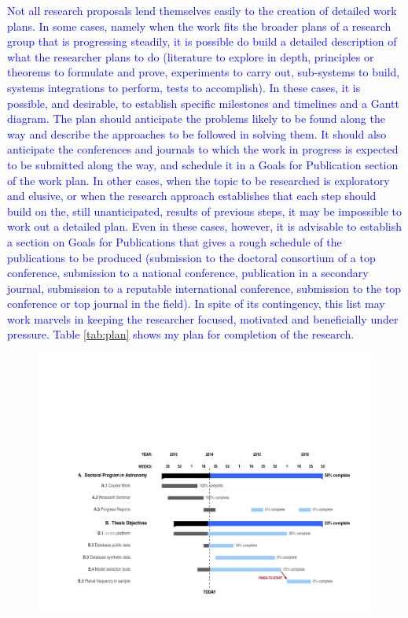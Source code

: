 \textcolor{blue}{
Not all research proposals lend themselves easily to the creation of detailed work plans. 
In some cases, namely when the work fits the broader plans of a research group that is 
progressing steadily, it is possible do build a detailed description of what the researcher 
plans to do (literature to explore in depth, principles or theorems to formulate and 
prove, experiments to carry out, sub-systems to build, systems integrations to perform, 
tests to accomplish). In these cases, it is possible, and desirable, to establish specific 
milestones and timelines and a Gantt diagram. The plan should anticipate the problems 
likely to be found along the way and describe the approaches to be followed in solving 
them. It should also anticipate the conferences and journals to which the work in 
progress is expected to be submitted along the way, and schedule it in a Goals for 
Publication section of the work plan. 
In other cases, when the topic to be researched is exploratory and elusive, or when the 
research approach establishes that each step should build on the, still unanticipated, 
results of previous steps, it may be impossible to work out a detailed plan. Even in these 
cases, however, it is advisable to establish a section on Goals for Publications that gives 
a rough schedule of the publications to be produced (submission to the doctoral 
consortium of a top conference, submission to a national conference, publication in a 
secondary journal, submission to a reputable international conference, submission to the 
top conference or top journal in the field). In spite of its contingency, this list may work 
marvels in keeping the researcher focused, motivated and beneficially under pressure. 
Table \ref{tab:plan} shows my plan for completion of the research.}


\begin{landscape}
	\begin{figure}
	\includegraphics[trim=75 0 0 200, clip]{./timeline_teste.pdf}
	\sscaption{%
	\label{fig:ganttchart}}
	\end{figure}
\end{landscape}